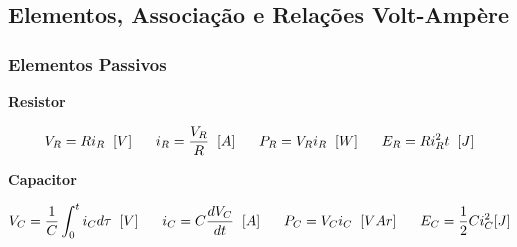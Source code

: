 \documentclass{article}
\numberwithin{equation}{section}
\begin{document}
    \subsection{Elementos, Associação e Relações Volt-Ampère}
    \label{subsec:elements}

    \subsubsection{Elementos Passivos}
    \label{subsubsec:passivos}

    \begin{center}{\textbf{Resistor}}\end{center}

    \begin{equation}
        V_{R} = Ri_{R} \hspace{0.2cm}[V]
        \hspace{0.6cm}
        i_{R} = \frac{V_{R}}{R} \hspace{0.2cm} [A]
        \hspace{0.6cm}
        P_{R} = V_{R}i_{R} \hspace{0.2cm} [W]
        \hspace{0.6cm}
        E_{R} = Ri_{R}^{2}t \hspace{0.2cm} [J]
    \end{equation}

    \begin{center}{\textbf{Capacitor}}\end{center}
    \begin{equation}
        V_{C} = \frac{1}{C}\int_{0}^{t}{i_{C}} d\tau \hspace{0.2cm}[V]
        \hspace{0.6cm}
        i_{C} = C \frac{dV_{C}}{dt} \hspace{0.2cm} [A]
        \hspace{0.6cm}
        P_{C} = V_{C}i_{C} \hspace{0.2cm} [VAr]
        \hspace{0.6cm}
        E_{C} = \frac{1}{2}Ci_{C}^{2} [J]
    \end{equation}
\end{document}
